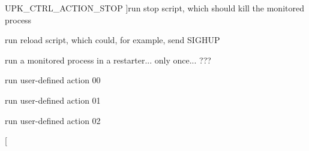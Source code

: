 \begin{Desc}
\begin{description}
{UPK\_\-CTRL\_\-ACTION\_\-STOP\label{group__controller_ga0d570130f3428734fef617272f44b7c9a9c3b195a723ca7d0e958f17f574d69c6}
}]run stop script, which should kill the monitored process \item[{\em 
UPK\_\-CTRL\_\-ACTION\_\-RELOAD\label{group__controller_ga0d570130f3428734fef617272f44b7c9a383e3644953490dd862c59e008f4fbb1}
}]run reload script, which could, for example, send SIGHUP \item[{\em 
UPK\_\-CTRL\_\-ACTION\_\-RUNONCE\label{group__controller_ga0d570130f3428734fef617272f44b7c9acaa9604bc8089b99580466955f2de9ca}
}]run a monitored process in a restarter... only once... ??? \item[{\em 
UPK\_\-CTRL\_\-CUSTOM\_\-ACTION\_\-00\label{group__controller_ga0d570130f3428734fef617272f44b7c9ad4d2d51e88be2a15e52904a3156add31}
}]run user-\/defined action 00 \item[{\em 
UPK\_\-CTRL\_\-CUSTOM\_\-ACTION\_\-01\label{group__controller_ga0d570130f3428734fef617272f44b7c9ac755fb8c7ea7a3fa3a42559451ceb92f}
}]run user-\/defined action 01 \item[{\em 
UPK\_\-CTRL\_\-CUSTOM\_\-ACTION\_\-02\label{group__controller_ga0d570130f3428734fef617272f44b7c9ade6a2b269652eda6621f40c9319307cd}
}]run user-\/defined action 02 \item[{\em 
}
\end{description}
\end{Desc}
